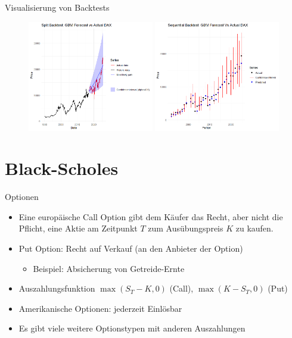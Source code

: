 \documentclass{beamer}
\begin{document}
\begin{frame}{Visualisierung von Backtests}
  \begin{figure}
    \centering
  \includegraphics[width=0.49\textwidth]{../thesis/images/dax_backtest.png}
  \includegraphics[width=0.49\textwidth]{../thesis/images/dax_backtest_seq.png}
  \end{figure}
\end{frame}

\section{Black-Scholes}

\begin{frame}{Optionen}
  \begin{itemize}
      \item Eine europäische Call Option gibt dem Käufer das Recht, aber nicht die Pflicht, eine Aktie am Zeitpunkt $T$ zum Ausübungspreis $K$ zu kaufen.
      \item Put Option: Recht auf Verkauf (an den Anbieter der Option)
      \begin{itemize}
        \item Beispiel: Absicherung von Getreide-Ernte
      \end{itemize} 
      \item Auszahlungsfunktion $\max(S_T-K,0)$ (Call), $\max(K-S_T, 0)$ (Put)
      \item Amerikanische Optionen: jederzeit Einlösbar
      \item Es gibt viele weitere Optionstypen mit anderen Auszahlungen
  \end{itemize}
\end{frame}
\end{document}
